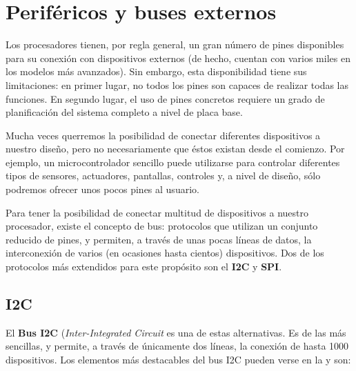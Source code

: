 \documentclass[../main.tex]{subfiles}
\begin{document}
\section{Periféricos y buses externos}

    Los procesadores tienen, por regla general, un gran número de pines disponibles para su conexión con dispositivos externos (de hecho, cuentan con varios miles en los modelos más avanzados). Sin embargo, esta disponibilidad tiene sus limitaciones: en primer lugar, no todos los pines son capaces de realizar todas las funciones. En segundo lugar, el uso de pines concretos requiere un grado de planificación del sistema completo a nivel de placa base. 
        
    Mucha veces querremos la posibilidad de conectar diferentes dispositivos a nuestro diseño, pero no necesariamente que éstos existan desde el comienzo. Por ejemplo, un microcontrolador sencillo puede utilizarse para controlar diferentes tipos de sensores, actuadores, pantallas, controles y, a nivel de diseño, sólo podremos ofrecer unos pocos pines al usuario.

    Para tener la posibilidad de conectar multitud de dispositivos a nuestro procesador, existe el concepto de bus: protocolos que utilizan un conjunto reducido de pines, y permiten, a través de unas pocas líneas de datos, la interconexión de varios (en ocasiones hasta cientos) dispositivos. Dos de los protocolos más extendidos para este propósito son el \textbf{I2C} y \textbf{SPI}.

    \subsection{I2C}

        El \textbf{Bus I2C} (\emph{Inter-Integrated Circuit} es una de estas alternativas. Es de las más sencillas, y permite, a través de únicamente dos líneas, la conexión de hasta 1000 dispositivos. Los elementos más destacables del bus I2C pueden verse en la  y son:
\end{document}
